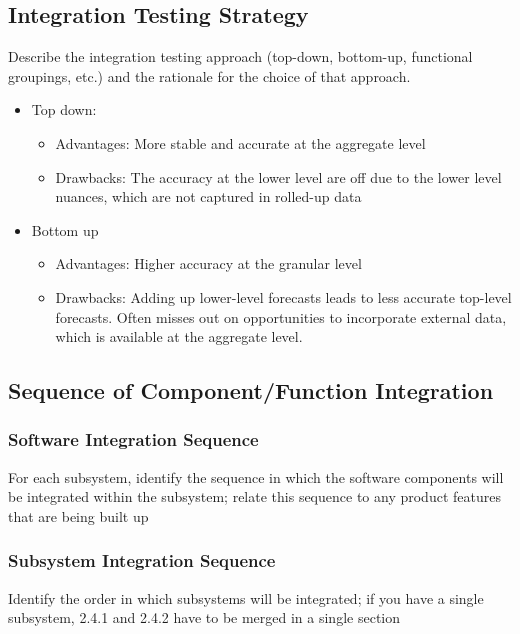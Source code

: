\subsection{Integration Testing Strategy} Describe the integration testing approach (top-down, bottom-up, functional groupings, etc.) and the rationale for the choice of that approach.
\begin{itemize}
\item Top down:
\begin{itemize}
\item Advantages: More stable and accurate at the aggregate level
\item Drawbacks: The accuracy at the lower level are off due to the lower level nuances, which are not captured in rolled-up data
\end{itemize}
\item Bottom up
\begin{itemize}
\item Advantages: Higher accuracy at the granular level
\item Drawbacks: Adding up lower-level forecasts leads to less accurate top-level forecasts. \newline Often misses out on opportunities to incorporate external data, which is available at the aggregate level. 

\end{itemize}

\end{itemize}
\subsection{Sequence of Component/Function Integration} 
\subsubsection{Software Integration Sequence} For each subsystem, identify the sequence in which the software components will be integrated within the subsystem; relate this sequence to any product features that are being built up
\subsubsection{Subsystem Integration Sequence} Identify the order in which subsystems will be integrated;  if you have a single subsystem, 2.4.1 and 2.4.2 have to be merged in a single section





